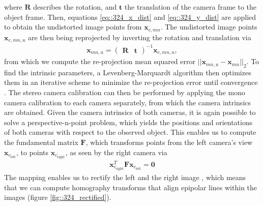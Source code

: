 where $\bm{R}$ describes the rotation, and $\bm{t}$ the translation of the camera frame to the object frame. Then, equations \ref{eq::324_x_dist} and \ref{eq::324_y_dist} are applied to obtain the undistorted image points from $\bm{x}_{c,mn}$. The undistorted image points $\bm{x}_{c,mn,u}$ are then being reprojected by inverting the rotation and translation via
\begin{align}
	\bm{x}_{mn,u} = \begin{pmatrix}
	\bm{R} & \bm{t}
	\end{pmatrix}^{-1}\bm{x}_{c,mn,u},
\end{align}
from which we compute the re-projection mean squared error $||\bm{x}_{mn,u} - \bm{x}_{mn}||_2$. To find the intrinsic parameters, a Levenberg-Marquardt algorithm then optimizes them in an iterative scheme to minimize the re-projection error until convergence \cite{zhang2000flexible}. The stereo camera calibration can then be performed by applying the mono camera calibration to each camera separately, from which the camera intrinsics are obtained. Given the camera intrinsics of both cameras, it is again possible to solve a perspective-n-point problem, which yields the positions and orientations of both cameras with respect to the observed object. This enables us to compute the fundamental matrix $\bm{F}$, which transforms points from the left camera's view $\bm{x}_{c_\text{left}}$, to points $\bm{x}_{c_\text{right}}$, as seen by the right camera via
\begin{align}
	\bm{x}_{c_\text{right}}^T\bm{F}\bm{x}_{c_\text{left}} = \bm{0}
\end{align}
The mapping enables us to rectify the left and the right image \cite{loop1999computing}, which means that we can compute homography transforms that align epipolar lines within the images (figure \ref{fig::324_rectified}). 
